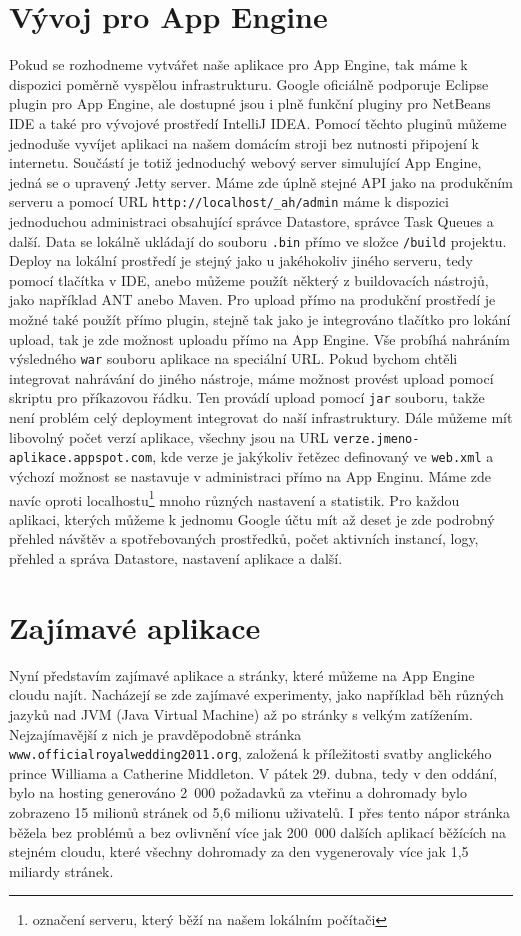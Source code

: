 \section{Vývoj pro App Engine}
Pokud se rozhodneme vytvářet naše aplikace pro App Engine, tak máme k dispozici poměrně vyspělou infrastrukturu. Google oficiálně podporuje Eclipse plugin pro App Engine, %
ale dostupné jsou i plně funkční pluginy pro NetBeans IDE %
a také pro vývojové prostředí IntelliJ IDEA. Pomocí těchto pluginů můžeme jednoduše vyvíjet aplikaci na našem domácím stroji bez nutnosti připojení k internetu. Součástí je totiž jednoduchý webový server simulující App Engine, jedná se o upravený Jetty server.%
Máme zde úplně stejné API jako na produkčním serveru a pomocí URL \verb|http://localhost/_ah/admin| máme k dispozici jednoduchou administraci obsahující správce Datastore, správce Task Queues a další. Data se lokálně ukládají do souboru \verb|.bin| přímo ve složce \verb|/build| projektu. Deploy na lokální prostředí je stejný jako u jakéhokoliv jiného serveru, tedy pomocí tlačítka v IDE, anebo můžeme použít některý z buildovacích nástrojů, jako například ANT anebo Maven. Pro upload přímo na produkční prostředí je možné také použít přímo plugin, stejně tak jako je integrováno tlačítko pro lokání upload, tak je zde možnost uploadu přímo na App Engine. Vše probíhá nahráním výsledného \verb|war| souboru aplikace na speciální URL. Pokud bychom chtěli integrovat nahrávání do jiného nástroje, máme možnost provést upload pomocí skriptu pro příkazovou řádku. Ten provádí upload pomocí \verb|jar| souboru, takže není problém celý deployment integrovat do naší infrastruktury. Dále můžeme mít libovolný počet verzí aplikace, všechny jsou na URL \verb|verze.jmeno-aplikace.appspot.com|, kde verze je jakýkoliv řetězec definovaný ve \verb|web.xml| a výchozí možnost se nastavuje v administraci přímo na App Enginu. Máme zde navíc oproti localhostu\footnote{označení serveru, který běží na našem lokálním počítači} mnoho různých nastavení a statistik. Pro každou aplikaci, kterých můžeme k jednomu Google účtu mít až deset je zde podrobný přehled návštěv a spotřebovaných prostředků, počet aktivních instancí, logy, přehled a správa Datastore, nastavení aplikace a další.

\section{Zajímavé aplikace}
Nyní představím zajímavé aplikace a stránky, které můžeme na App Engine cloudu najít. Nacházejí se zde zajímavé experimenty, jako například běh různých jazyků nad JVM (Java Virtual Machine) až po stránky s velkým zatížením. Nejzajímavější z nich je pravděpodobně stránka \verb|www.officialroyalwedding2011.org|, založená k příležitosti svatby anglického prince Williama a Catherine Middleton. V pátek 29. dubna, tedy v den oddání, bylo na hosting generováno 2~000 požadavků za vteřinu a dohromady bylo zobrazeno 15 milionů stránek od 5,6 milionu uživatelů. I přes tento nápor stránka běžela bez problémů a bez ovlivnění více jak 200~000 dalších aplikací běžících na stejném cloudu, které všechny dohromady za den vygenerovaly více jak 1,5 miliardy stránek. \cite{royal-wedding}

